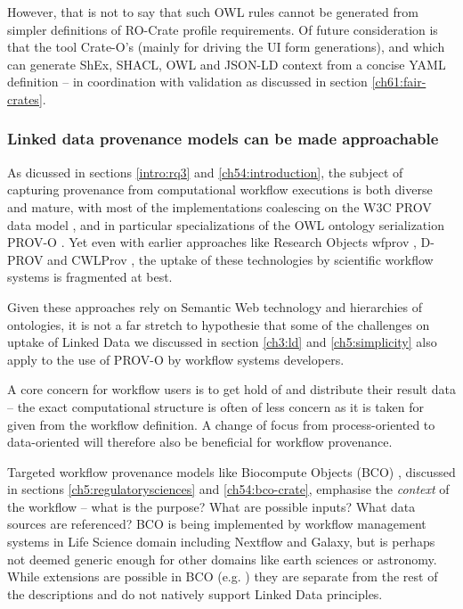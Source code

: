 However, that is not to say that such OWL rules cannot be generated from simpler definitions of RO-Crate profile requirements. Of future consideration is that the tool Crate-O's   (mainly for driving the UI form generations), and  which can generate ShEx, SHACL, OWL and JSON-LD context from a concise YAML definition -- in coordination with validation as discussed in section \vref{ch61:fair-crates}.




\subsubsection{Linked data provenance models can be made approachable}

As dicussed in sections \vref{intro:rq3} and \vref{ch54:introduction}, the subject of capturing provenance from computational workflow executions is both diverse and mature, with most of the implementations coalescing on the W3C PROV data model \cite{Moreau 2013}, and in particular specializations of the OWL ontology serialization PROV-O \cite{w3-prov-o}. Yet even with earlier approaches like Research Objects wfprov \cite{Belhajjame 2015}, D-PROV \cite{Missier 2013} and CWLProv \cite{Khan 2019}, the uptake of these technologies by scientific workflow systems is fragmented at best.

Given these approaches rely on Semantic Web technology and hierarchies of ontologies, it is not a far stretch to hypothesie that some of the challenges on uptake of Linked Data we discussed in section \vref{ch3:ld} and \vref{ch5:simplicity} also apply to the use of PROV-O by workflow systems developers. 

A core concern for workflow users is to get hold of and distribute their result data -- the exact computational structure is often of less concern as it is taken for given from the workflow definition. A change of focus from process-oriented to data-oriented will therefore also be beneficial for workflow provenance. 

Targeted workflow provenance models like Biocompute Objects (BCO) \cite{ieee2791,Alterovitz 2018}, discussed in sections \vref{ch5:regulatorysciences} and \vref{ch54:bco-crate}, emphasise the \emph{context} of the workflow -- what is the purpose? What are possible inputs? What data sources are referenced?  BCO is being implemented by workflow management systems in Life Science domain including Nextflow and Galaxy, but is perhaps not deemed generic enough for other domains like earth sciences or astronomy.  While extensions are possible in BCO (e.g. ) they are separate from the rest of the descriptions and do not natively support Linked Data principles.


